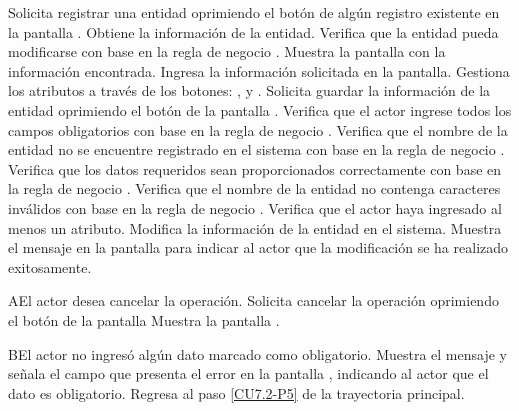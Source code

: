 	\begin{UCtrayectoria}
		\UCpaso[\UCactor] Solicita registrar una entidad oprimiendo el botón \editar de algún registro existente en la pantalla .
		\UCpaso[\UCsist] Obtiene la información de la entidad.
		\UCpaso[\UCsist] Verifica que la entidad pueda modificarse con base en la regla de negocio . 
		\UCpaso[\UCsist] Muestra la pantalla  con la información encontrada.
		\UCpaso[\UCactor] Ingresa la información solicitada en la pantalla. \label{CU7.2-P5}
		\UCpaso[\UCactor] Gestiona los atributos a través de los botones: , \editar y \eliminar. \label{CU7.2-P6}
		\UCpaso[\UCactor] Solicita guardar la información de la entidad oprimiendo el botón  de la pantalla . 
		\UCpaso[\UCsist] Verifica que el actor ingrese todos los campos obligatorios con base en la regla de negocio . 
		\UCpaso[\UCsist] Verifica que el nombre de la entidad no se encuentre registrado en el sistema con base en la regla de negocio . 
		\UCpaso[\UCsist] Verifica que los datos requeridos sean proporcionados correctamente con base en la regla de negocio .  
		\UCpaso[\UCsist] Verifica que el nombre de la entidad no contenga caracteres inválidos con base en la regla de negocio . 
		\UCpaso[\UCsist] Verifica que el actor haya ingresado al menos un atributo. 
		\UCpaso[\UCsist] Modifica la información de la entidad en el sistema.
		\UCpaso[\UCsist] Muestra el mensaje  en la pantalla  para indicar al actor que la modificación se ha realizado exitosamente.
	\end{UCtrayectoria}		
	
	\begin{UCtrayectoriaA}{A}{El actor desea cancelar la operación.}
		\UCpaso[\UCactor] Solicita cancelar la operación oprimiendo el botón  de la pantalla 
		\UCpaso[\UCsist] Muestra la pantalla .
	\end{UCtrayectoriaA}

	\begin{UCtrayectoriaA}{B}{El actor no ingresó algún dato marcado como obligatorio.}
		\UCpaso[\UCsist] Muestra el mensaje  y señala el campo que presenta el error en la pantalla , indicando al actor que el dato es obligatorio.
		\UCpaso Regresa al paso \ref{CU7.2-P5} de la trayectoria principal.
	\end{UCtrayectoriaA}
	
